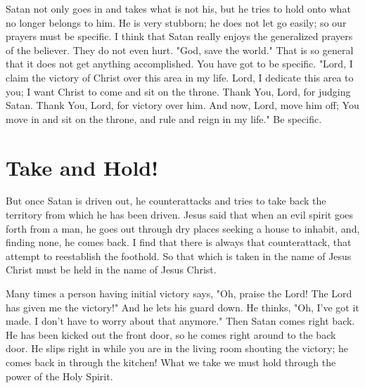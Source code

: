 Satan not only goes in and takes what is not his, but he tries to hold onto what no longer belongs to him. He is very stubborn; he does not let go easily; so our prayers must be specific. I think that Satan really enjoys the generalized prayers of the believer. They do not even hurt. "God, save the world." That is so general that it does not get anything accomplished. You have got to be specific. "Lord, I claim the victory of Christ over this area in my life. Lord, I dedicate this area to you; I want Christ to come and sit on the throne. Thank You, Lord, for judging Satan. Thank You, Lord, for victory over him. And now, Lord, move him off; You move in and sit on the throne, and rule and reign in my life." Be specific. 

\section*{Take and Hold!}

But once Satan is driven out, he counterattacks and tries to take back the territory from which he has been driven. Jesus said that when an evil spirit goes forth from a man, he goes out through dry places seeking a house to inhabit, and, finding none, he comes back. I find that there is always that counterattack, that attempt to reestablish the foothold. So that which is taken in the name of Jesus Christ must be held in the name of Jesus Christ. 

Many times a person having initial victory says, "Oh, praise the Lord! The Lord has given me the victory!" And he lets his guard down. He thinks, "Oh, I've got it made. I don't have to worry about that anymore." Then Satan comes right back. He has been kicked out the front door, so he comes right around to the back door. He slips right in while you are in the living room shouting the victory; he comes back in through the kitchen! What we take we must hold through the power of the Holy Spirit. 


